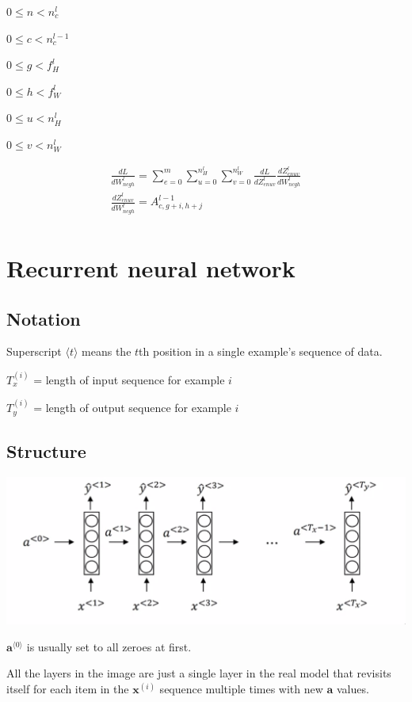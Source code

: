 \documentclass[12pt]{article}
\begin{document}
$0 \le n < n_c^l$

$0 \le c < n_c^{l-1}$

$0 \le g < f_H^l$

$0 \le h < f_W^l$

$0 \le u < n_H^l$

$0 \le v < n_W^l$

\begin{gather*}
    \frac{dL}{dW^l_{ncgh}} = \sum_{e=0}^m \sum_{u=0}^{n_H^l} \sum_{v=0}^{n_W^l} \frac{dL}{dZ^l_{enuv}}
    \frac{dZ^l_{enuv}}{dW^l_{ncgh}}\\
    \frac{dZ^l_{enuv}}{dW^l_{ncgh}} = A^{l-1}_{c,g+i,h+j}\\
\end{gather*}

\section{Recurrent neural network}

\subsection{Notation}

Superscript $\langle t \rangle$ means the $t$th position in a single example's sequence of data.

$T^{(i)}_x$ = length of input sequence for example $i$

$T^{(i)}_y$ = length of output sequence for example $i$

\subsection{Structure}

\includegraphics[scale=.5]{images/rnn.png}

$\bm a^{\langle 0 \rangle}$ is usually set to all zeroes at first.

All the layers in the image are just a single layer in the real model that revisits itself for
each item in the $\bm x^{(i)}$ sequence multiple times with new $\bm a$ values.
\end{document}
